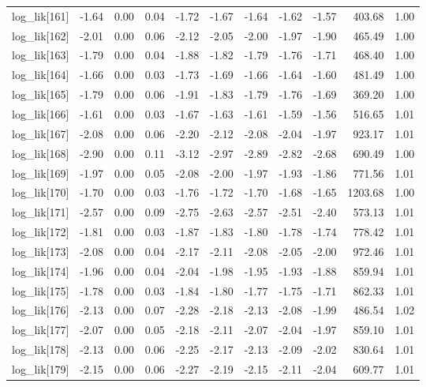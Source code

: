 \begin{table}[ht]
\begin{tabular}{rrrrrrrrrrr}
  log\_lik[161] & -1.64 & 0.00 & 0.04 & -1.72 & -1.67 & -1.64 & -1.62 & -1.57 & 403.68 & 1.00 \\ 
  log\_lik[162] & -2.01 & 0.00 & 0.06 & -2.12 & -2.05 & -2.00 & -1.97 & -1.90 & 465.49 & 1.00 \\ 
  log\_lik[163] & -1.79 & 0.00 & 0.04 & -1.88 & -1.82 & -1.79 & -1.76 & -1.71 & 468.40 & 1.00 \\ 
  log\_lik[164] & -1.66 & 0.00 & 0.03 & -1.73 & -1.69 & -1.66 & -1.64 & -1.60 & 481.49 & 1.00 \\ 
  log\_lik[165] & -1.79 & 0.00 & 0.06 & -1.91 & -1.83 & -1.79 & -1.76 & -1.69 & 369.20 & 1.00 \\ 
  log\_lik[166] & -1.61 & 0.00 & 0.03 & -1.67 & -1.63 & -1.61 & -1.59 & -1.56 & 516.65 & 1.01 \\ 
  log\_lik[167] & -2.08 & 0.00 & 0.06 & -2.20 & -2.12 & -2.08 & -2.04 & -1.97 & 923.17 & 1.01 \\ 
  log\_lik[168] & -2.90 & 0.00 & 0.11 & -3.12 & -2.97 & -2.89 & -2.82 & -2.68 & 690.49 & 1.00 \\ 
  log\_lik[169] & -1.97 & 0.00 & 0.05 & -2.08 & -2.00 & -1.97 & -1.93 & -1.86 & 771.56 & 1.01 \\ 
  log\_lik[170] & -1.70 & 0.00 & 0.03 & -1.76 & -1.72 & -1.70 & -1.68 & -1.65 & 1203.68 & 1.00 \\ 
  log\_lik[171] & -2.57 & 0.00 & 0.09 & -2.75 & -2.63 & -2.57 & -2.51 & -2.40 & 573.13 & 1.01 \\ 
  log\_lik[172] & -1.81 & 0.00 & 0.03 & -1.87 & -1.83 & -1.80 & -1.78 & -1.74 & 778.42 & 1.01 \\ 
  log\_lik[173] & -2.08 & 0.00 & 0.04 & -2.17 & -2.11 & -2.08 & -2.05 & -2.00 & 972.46 & 1.01 \\ 
  log\_lik[174] & -1.96 & 0.00 & 0.04 & -2.04 & -1.98 & -1.95 & -1.93 & -1.88 & 859.94 & 1.01 \\ 
  log\_lik[175] & -1.78 & 0.00 & 0.03 & -1.84 & -1.80 & -1.77 & -1.75 & -1.71 & 862.33 & 1.01 \\ 
  log\_lik[176] & -2.13 & 0.00 & 0.07 & -2.28 & -2.18 & -2.13 & -2.08 & -1.99 & 486.54 & 1.02 \\ 
  log\_lik[177] & -2.07 & 0.00 & 0.05 & -2.18 & -2.11 & -2.07 & -2.04 & -1.97 & 859.10 & 1.01 \\ 
  log\_lik[178] & -2.13 & 0.00 & 0.06 & -2.25 & -2.17 & -2.13 & -2.09 & -2.02 & 830.64 & 1.01 \\ 
  log\_lik[179] & -2.15 & 0.00 & 0.06 & -2.27 & -2.19 & -2.15 & -2.11 & -2.04 & 609.77 & 1.01 \\ 

\end{tabular}
\end{table}
